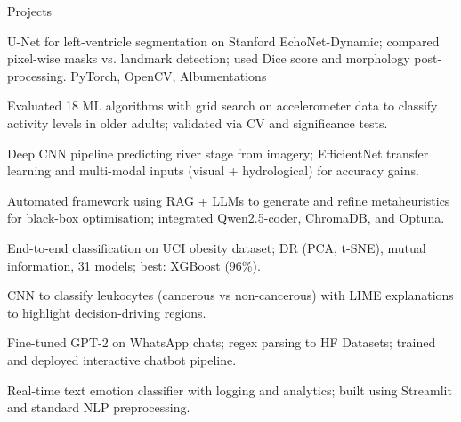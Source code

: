 \begin{rubric}{Projects}
\noentry{~}

U-Net for left-ventricle segmentation on Stanford EchoNet-Dynamic; compared pixel-wise masks vs. landmark detection; used Dice score and morphology post-processing.\hfill {} PyTorch, OpenCV, Albumentations\hfill \href{https://github.com/Tec-AI-23/EchoNetDynamic}{\faGithub}

Evaluated 18 ML algorithms with grid search on accelerometer data to classify activity levels in older adults; validated via CV and significance tests.\hfill \href{https://github.com/Tec-AI-23/HAR70}{\faGithub}

Deep CNN pipeline predicting river stage from imagery; EfficientNet transfer learning and multi-modal inputs (visual + hydrological) for accuracy gains.\hfill \href{https://github.com/musel25/research_deep_learning}{\faGithub}

Automated framework using RAG + LLMs to generate and refine metaheuristics for black-box optimisation; integrated Qwen2.5-coder, ChromaDB, and Optuna.\hfill \href{https://github.com/musel25/llm-metaheuristics}{\faGithub}

End-to-end classification on UCI obesity dataset; DR (PCA, t-SNE), mutual information, 31 models; best: XGBoost (96\%).\hfill \href{https://github.com/musel25/obesity_ml}{\faGithub}

CNN to classify leukocytes (cancerous vs non-cancerous) with LIME explanations to highlight decision-driving regions.

Fine-tuned GPT-2 on WhatsApp chats; regex parsing to HF Datasets; trained and deployed interactive chatbot pipeline.\hfill \href{https://github.com/musel25/her_if_it_was_2025}{\faGithub}

Real-time text emotion classifier with logging and analytics; built using Streamlit and standard NLP preprocessing.\hfill \href{https://github.com/musel25/nlp_project}{\faFacebook}

\end{rubric}
